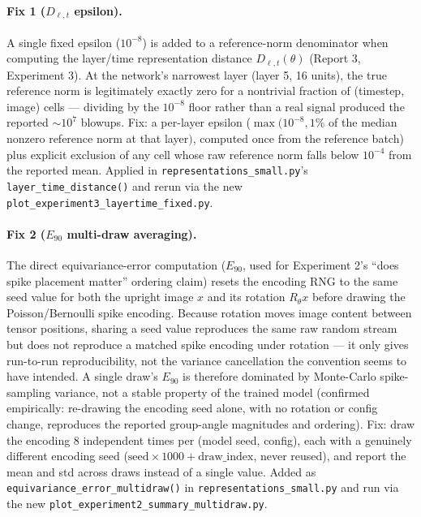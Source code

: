 \documentclass[11pt]{article}
\begin{document}
\paragraph{Fix 1 ($D_{\ell,t}$ epsilon).} A single fixed epsilon ($10^{-8}$) is added to a reference-norm
denominator when computing the layer/time representation distance $D_{\ell,t}(\theta)$ (Report 3,
Experiment 3). At the network's narrowest layer (layer 5, 16 units), the true reference norm is
legitimately exactly zero for a nontrivial fraction of (timestep, image) cells --- dividing by the
$10^{-8}$ floor rather than a real signal produced the reported $\sim 10^7$ blowups. Fix: a per-layer
epsilon ($\max(10^{-8}, 1\%$ of the median nonzero reference norm at that layer$)$, computed once from
the reference batch) plus explicit exclusion of any cell whose raw reference norm falls below $10^{-4}$
from the reported mean. Applied in \texttt{representations\_small.py}'s \texttt{layer\_time\_distance()}
and rerun via the new \texttt{plot\_experiment3\_layertime\_fixed.py}.

\paragraph{Fix 2 ($E_{90}$ multi-draw averaging).} The direct equivariance-error computation ($E_{90}$,
used for Experiment 2's ``does spike placement matter'' ordering claim) resets the encoding RNG to the
same seed value for both the upright image $x$ and its rotation $R_\theta x$ before drawing the
Poisson/Bernoulli spike encoding. Because rotation moves image content between tensor positions, sharing
a seed value reproduces the same raw random stream but does not reproduce a matched spike encoding
under rotation --- it only gives run-to-run reproducibility, not the variance cancellation the
convention seems to have intended. A single draw's $E_{90}$ is therefore dominated by Monte-Carlo
spike-sampling variance, not a stable property of the trained model (confirmed empirically: re-drawing
the encoding seed alone, with no rotation or config change, reproduces the reported group-angle
magnitudes and ordering). Fix: draw the encoding 8 independent times per (model seed, config), each with
a genuinely different encoding seed ($\text{seed}\times1000 + \text{draw\_index}$, never reused), and
report the mean and std across draws instead of a single value. Added as
\texttt{equivariance\_error\_multidraw()} in \texttt{representations\_small.py} and run via the new
\texttt{plot\_experiment2\_summary\_multidraw.py}.
\end{document}
